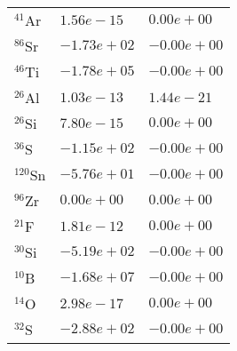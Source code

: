 \begin{tabular}{lll}
 $^{41}$Ar  & $1.56e-15 $                                                        & $0.00e+00 $                                                                     \\
 $^{86}$Sr  & $-1.73e+02 $                                                       & $-0.00e+00 $                                                                    \\
 $^{46}$Ti  & $-1.78e+05 $                                                       & $-0.00e+00 $                                                                    \\
 $^{26}$Al  & $1.03e-13 $                                                        & $1.44e-21 $                                                                     \\
 $^{26}$Si  & $7.80e-15 $                                                        & $0.00e+00 $                                                                     \\
 $^{36}$S   & $-1.15e+02 $                                                       & $-0.00e+00 $                                                                    \\
 $^{120}$Sn & $-5.76e+01 $                                                       & $-0.00e+00 $                                                                    \\
 $^{96}$Zr  & $0.00e+00 $                                                        & $0.00e+00 $                                                                     \\
 $^{21}$F   & $1.81e-12 $                                                        & $0.00e+00 $                                                                     \\
 $^{30}$Si  & $-5.19e+02 $                                                       & $-0.00e+00 $                                                                    \\
 $^{10}$B   & $-1.68e+07 $                                                       & $-0.00e+00 $                                                                    \\
 $^{14}$O   & $2.98e-17 $                                                        & $0.00e+00 $                                                                     \\
 $^{32}$S   & $-2.88e+02 $                                                       & $-0.00e+00 $                                                                    \\

\end{tabular}
